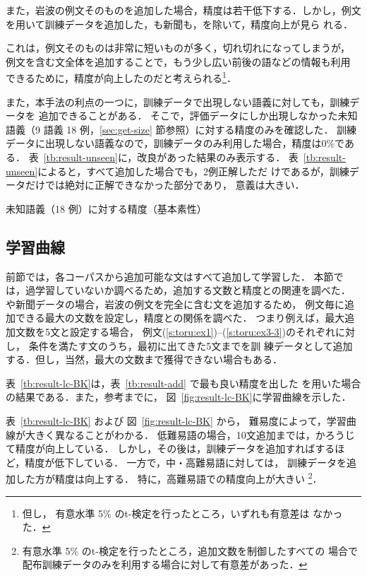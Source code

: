 \documentclass[japanese]{jnlp_1.4}
\newcommand{\OW}{}
\newcommand{\PB}{}
\newcommand{\bccwj}{}
\begin{document}
また，岩波の例文そのものを追加した場合，精度は若干低下する．しかし，例文
を用いて訓練データを追加した，\bccwj{}も新聞も，\OW{}を除いて，精度向上が見ら
れる．

これは，例文そのものは非常に短いものが多く，切れ切れになってしまうが，
例文を含む文全体を追加することで，もう少し広い前後の語などの情報も利用
できるために，精度が向上したのだと考えられる\footnote{ 但し，
有意水準 5\% のt-検定を行ったところ，いずれも有意差は
なかった．}．


また，本手法の利点の一つに，訓練データで出現しない語義に対しても，訓練データを
追加できることがある．
そこで，評価データにしか出現しなかった未知語義（9 語義 18 例，\ref{sec:get-size}
節参照）に対する精度のみを確認した．
訓練データに出現しない語義なので，訓練データのみ利用した場合，精度は0\%である．
表~\ref{tb:result-unseen}に，改良があった結果のみ表示する．
表~\ref{tb:result-unseen}によると，すべて追加した場合でも，2例正解しただ
けであるが，訓練データだけでは絶対に正解できなかった部分であり，
意義は大きい．


\begin{table}[b]
\caption{未知語義（18 例）に対する精度（基本素性）} 
\label{tb:result-unseen}

\end{table}



\subsection{学習曲線} 
\label{sec:result-lc}

前節では，各コーパスから追加可能な文はすべて追加して学習した．
本節では，過学習していないか調べるため，追加する文数と精度との関連を調べた．
\bccwj{}や新聞データの場合，岩波の例文を完全に含む文を追加するため，
例文毎に追加できる最大の文数を設定し，精度との関係を調べた．
つまり例えば，最大追加文数を5文と設定する場合，
例文(\ref{s:toru:ex1})--(\ref{s:toru:ex3-3})のそれぞれに対し，
条件を満たす文のうち，最初に出てきた5文までを訓
練データとして追加する．但し，当然，最大の文数まで獲得できない場合もある．

表~\ref{tb:result-lc-BK}は，表~\ref{tb:result-add} で最も良い精度を出した
\PB{}を用いた場合の結果である．また，参考までに，
図~\ref{fig:result-lc-BK}に学習曲線を示した．

表~\ref{tb:result-lc-BK} および 図~\ref{fig:result-lc-BK} から，
難易度によって，学習曲線が大きく異なることがわかる．
低難易語の場合，10文追加までは，かろうじて精度が向上している．
しかし，その後は，訓練データを追加すればするほど，精度が低下している．
一方で，中・高難易語に対しては，
訓練データを追加した方が精度は向上する．
特に，高難易語での精度向上が大きい
\footnote{有意水準 5\% のt-検定を行ったところ，追加文数を制御したすべての
場合で配布訓練データのみを利用する場合に対して有意差があった．}．
\end{document}
